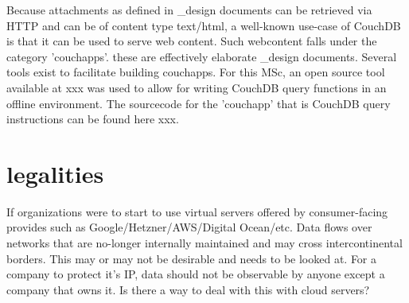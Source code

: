 Because attachments as defined in \_design documents can be retrieved via HTTP and can be of content type text/html, a well-known use-case of CouchDB is that it can be used to serve web content. Such webcontent falls under the category 'couchapps'. these are effectively elaborate \_design documents. Several tools exist to facilitate building couchapps. For this MSc, an open source tool available at xxx was used to allow for writing CouchDB query functions in an offline environment. The sourcecode for the 'couchapp' that is CouchDB query instructions can be found here xxx.

\section{legalities}
If organizations were to start to use virtual servers offered by consumer-facing provides such as Google/Hetzner/AWS/Digital Ocean/etc. Data flows over networks that are no-longer internally maintained and may cross intercontinental borders. This may or may not be desirable and needs to be looked at. For a company to protect it's IP, data should not be observable by anyone except a company that owns it. Is there a way to deal with this with cloud servers?